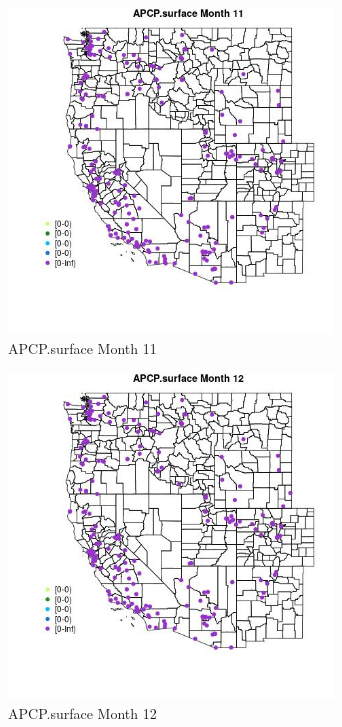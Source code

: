\begin{figure} 
\centering  
\includegraphics[width=0.77\textwidth]{Code_Outputs/Report_ML_input_PM25_Step4_part_e_de_duplicated_aveswNAs_MapObsMo11APCPsurface.jpg} 
\caption{\label{fig:Report_ML_input_PM25_Step4_part_e_de_duplicated_aveswNAsMapObsMo11APCPsurface}APCP.surface Month 11} 
\end{figure} 
 

\begin{figure} 
\centering  
\includegraphics[width=0.77\textwidth]{Code_Outputs/Report_ML_input_PM25_Step4_part_e_de_duplicated_aveswNAs_MapObsMo12APCPsurface.jpg} 
\caption{\label{fig:Report_ML_input_PM25_Step4_part_e_de_duplicated_aveswNAsMapObsMo12APCPsurface}APCP.surface Month 12} 
\end{figure} 
 

